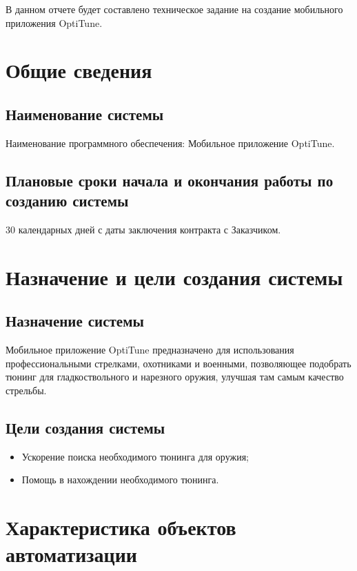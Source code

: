 \documentclass[14pt]{extreport}
\begin{document}
\pagestyle{empty} 


\pagestyle{plain}
\tableofcontents
 

\intro 

В данном отчете будет составлено техническое задание на создание мобильного приложения OptiTune.

\chapter{Общие сведения}
\section{Наименование системы}
Наименование программного обеспечения: Мобильное приложение OptiTune.

\section{Плановые сроки начала и окончания работы по созданию системы}
30 календарных дней с даты заключения контракта с Заказчиком.

\chapter{Назначение и цели создания системы}
\section{Назначение системы}
Мобильное приложение OptiTune предназначено для использования профессиональными стрелками, охотниками и военными, позволяющее подобрать тюнинг для гладкоствольного и нарезного оружия, улучшая там самым качество стрельбы.

\section{Цели создания системы}

\begin{itemize}
	\item Ускорение поиска необходимого тюнинга для оружия;	
	\item Помощь в нахождении необходимого тюнинга.
\end{itemize}


\chapter{Характеристика объектов автоматизации}
\end{document}
